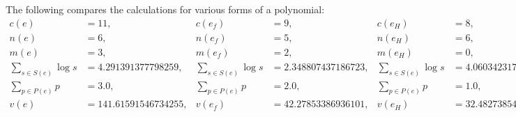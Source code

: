 \documentclass[]{elsarticle}
\begin{document}
\iffalse
\begin{example}
	The following compares the calculations for various forms of a polynomial:
	\begin{align*}
		c(e) &= 11, & c(e_f) &= 9, & c(e_H) &= 8, \\
		n(e) &= 6, & n(e_f) &= 5, & n(e_H) &= 6, \\
		m(e) &= 3, & m(e_f) &= 2, & m(e_H) &= 0, \\
		\sum_{s\in S(e)}\log s &= 4.291391377798259, & \sum_{s\in S(e)}\log s &= 2.348807437186723, & \sum_{s\in S(e)}\log s &= 4.060342317611611, \\
		\sum_{p\in P(e)}p &= 3.0, & \sum_{p\in P(e)}p &= 2.0, & \sum_{p\in P(e)}p &= 1.0, \\
		v(e) &= 141.61591546734255, & v(e_f) &= 42.27853386936101, & v(e_H) &= 32.48273854089289
	\end{align*}
\end{example}
\end{document}
